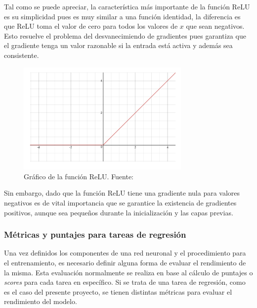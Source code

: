             Tal como se puede apreciar, la característica más importante de la función ReLU es su simplicidad pues es muy 
            similar a una función identidad, la diferencia es que ReLU toma el valor de cero para todos los valores de $x$ que 
            sean negativos. Esto resuelve el problema del desvanecimiendo de gradientes pues garantiza que el gradiente 
            tenga un valor razonable si la entrada está activa y además sea consistente.

            \begin{figure}[!h] 
                \centering
                \includegraphics[width=0.75\textwidth]{img/relu}
                \caption[Gráfico de la función ReLU]{Gráfico de la función ReLU. Fuente: \cite{wang_2016} }
                \label{fig:relu}
            \end{figure}

            Sin embargo, dado que la función ReLU tiene una gradiente nula para valores negativos es de vital importancia 
            que se garantice la existencia de gradientes positivos, aunque sea pequeños durante la inicialización y las capas 
            previas.

        
        \subsubsection{Métricas y puntajes para tareas de regresión}
        Una vez definidos los componentes de una red neuronal y el procedimiento para el entrenamiento, es necesario 
        definir alguna forma de evaluar el rendimiento de la misma. Esta evaluación normalmente se realiza en base al 
        cálculo de puntajes o \textit{scores} para cada tarea en específico. Si se trata de una tarea de regresión, como 
        es el caso del presente proyecto, se tienen distintas métricas para evaluar el rendimiento del modelo.


